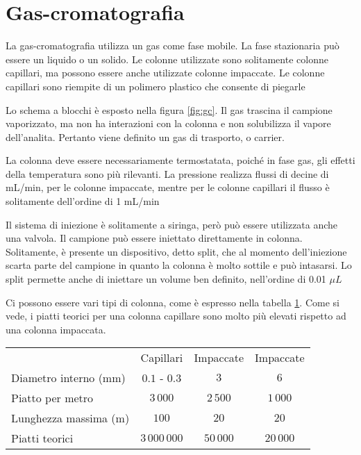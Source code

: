 \section{Gas-cromatografia}
La gas-cromatografia utilizza un gas come fase mobile.
La fase stazionaria può essere un liquido o un solido.
Le colonne utilizzate sono solitamente colonne capillari, ma possono essere anche utilizzate colonne impaccate.
Le colonne capillari sono riempite di un polimero plastico che consente di piegarle


Lo schema a blocchi è esposto nella figura \ref{fig:gc}. 
Il gas trascina il campione vaporizzato, ma non ha interazioni con la colonna e non solubilizza il vapore dell'analita.
Pertanto viene definito un gas di trasporto, o carrier.


La colonna deve essere necessariamente termostatata, poiché in fase gas, gli effetti della temperatura sono più rilevanti. La pressione realizza flussi di decine di mL/min, per le colonne impaccate, mentre per le colonne capillari il flusso è solitamente dell'ordine di 1 mL/min

Il sistema di iniezione è solitamente a siringa, però può essere utilizzata anche una valvola. Il campione può essere iniettato direttamente in colonna. Solitamente, è presente un dispositivo, detto split, che al momento dell'iniezione scarta parte del campione in quanto la colonna è molto sottile e può intasarsi. Lo split permette anche di iniettare un volume ben definito, nell'ordine di 0.01 $\mu L$

Ci possono essere vari tipi di colonna, come è espresso nella tabella \ref{tab:colonnegc}. Come si vede, i piatti teorici per una colonna capillare sono molto più elevati rispetto ad una colonna impaccata.

\begin{table}
\begin{tabular}{lccc}
& Capillari & Impaccate & Impaccate\\
Diametro interno (mm) & $0.1$ - $0.3$ & $3$ & $6$\\
Piatto per metro & $3\,000$ & $2\,500$ & $1\,000$\\
Lunghezza massima (m) & $100$ & $20$ & $20$\\
Piatti teorici & $3\,000\,000$ & $50\,000$ & $20\,000$\\
\end{tabular}
\label{tab:colonnegc}
\end{table}

